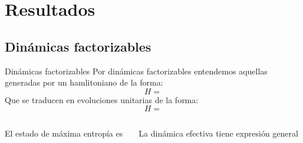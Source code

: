 \section{Resultados}
\subsection{Dinámicas factorizables}
\begin{frame}{Dinámicas factorizables}
    Por dinámicas factorizables entendemos aquellas generadas por un hamlitoniano de la forma:
    \begin{equation}
        H=\nonumber
    \end{equation}
    Que se traducen en evoluciones unitarias de la forma:
    \begin{equation}
        H=\nonumber
    \end{equation}
    \begin{columns}
        \begin{column}{0.5\textwidth}
            El estado de máxima entropía es
        \end{column}
        \begin{column}{0.5\textwidth}
            La dinámica efectiva tiene expresión general
        \end{column}
    \end{columns}
\end{frame}

